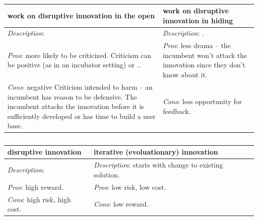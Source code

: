 \begin{center}
\begin{table}[ht]
\begin{tabular}{ | m{\dilemmatablewidth}| m{\dilemmatablewidth} | } 
  \hline
  \textbf{work on disruptive innovation in the open} &
  \textbf{work on disruptive innovation in hiding} \\
  \hline
  \textit{Description}:  &
  \textit{Description}: .  \\  
  \hline
  \textit{Pros}: more likely to be criticized. Criticism can be positive (as in an incubator setting) or .. & 
  \textit{Pros}: less drama -- the incumbent won't attack the innovation since they don't know about it. \\
  \hline
  \textit{Cons}: negative Criticism intended to harm -- an incumbent has reason to be defensive. The incumbent attacks the innovation before it is sufficiently developed or has time to build a user base. & 
  \textit{Cons}: less opportunity for feedback. \\
  \hline
\end{tabular}
\caption{
}
\label{table:innovate-open-obscure}
\end{table}
\end{center}

\begin{center}
\begin{table}[ht]
\begin{tabular}{ | m{\dilemmatablewidth}| m{\dilemmatablewidth} | } 
  \hline
  \textbf{disruptive innovation} &
  \textbf{iterative (evoluationary) innovation} \\
  \hline
  \textit{Description}:   &
  \textit{Description}: starts with change to existing solution.  \\  
  \hline
  \textit{Pros}: high reward. & 
  \textit{Pros}: low risk, low cost. \\
  \hline
  \textit{Cons}: high risk, high cost. & 
  \textit{Cons}: low reward. \\
  \hline
\end{tabular}
\caption{
}
\label{table:disruptive-or-iterative}
\end{table}
\end{center}

